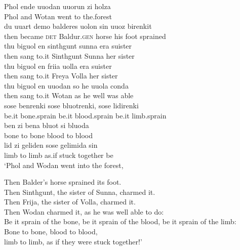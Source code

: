 \gll Phol   ende  uuodan       uuorun  zi   holza\\
Phol  and     Wotan    went  to  the.forest\\

\gll du     uuart   demo   balderes   uolon     sin uuoz   birenkit\\
then  became  \textsc{det}    Baldur.\textsc{gen}  horse  his foot    sprained\\

\gll thu     biguol   en    sinthgunt     sunna   era suister\\
then  sang   to.it   Sinthgunt  Sunna  her sister\\

\gll thu     biguol   en    friia      uolla   era suister\\
then  sang  to.it   Freya  Volla  her sister\\

\gll thu     biguol   en    uuodan       so   he   uuola   conda\\
then  sang  to.it   Wotan    as  he  well    {was able}\\

\gll sose   benrenki   sose   bluotrenki,       sose   lidirenki\\
be.it    bone.sprain  be.it    blood.sprain    be.it    limb.sprain\\

\gll ben     zi   bena       bluot   si   bluoda\\
bone  to  bone  blood  to  blood\\

\gll lid     zi   geliden  sose   gelimida     sin\\
limb  to  limb  as.if    {stuck together}  be\\

\glt ‘Phol and Wodan went into the forest,

Then Balder’s horse sprained its foot.\\
Then Sinthgunt, the sister of Sunna, charmed it.\\
Then Frija, the sister of Volla, charmed it.\\
Then Wodan charmed it, as he was well able to do:\\
Be it sprain of the bone, be it sprain of the blood, be it sprain of the limb:\\
Bone to bone, blood to blood,\\
limb to limb, as if they were stuck together!’\\
    \z

